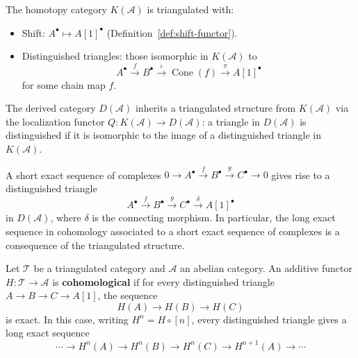 \begin{theorem}\label{thm:K-A-triangulated}
The homotopy category $K(\mathcal{A})$ is triangulated with:
\begin{itemize}
    \item Shift: $A^\bullet \mapsto A[1]^\bullet$ (Definition~\ref{def:shift-functor}).
    \item Distinguished triangles: those isomorphic in $K(\mathcal{A})$ to
    \[
        A^\bullet \xrightarrow{f} B^\bullet \xrightarrow{\iota} \operatorname{Cone}(f)
        \xrightarrow{\pi} A[1]^\bullet
    \]
    for some chain map $f$.
\end{itemize}
\end{theorem}

\begin{theorem}\label{thm:D-A-triangulated}
The derived category $D(\mathcal{A})$ inherits a triangulated structure from $K(\mathcal{A})$
via the localization functor $Q \colon K(\mathcal{A}) \to D(\mathcal{A})$: a triangle in
$D(\mathcal{A})$ is distinguished if it is isomorphic to the image of a distinguished
triangle in $K(\mathcal{A})$.
\end{theorem}

\begin{proposition}\label{prop:ses-to-triangle}
A short exact sequence of complexes $0 \to A^\bullet \xrightarrow{f} B^\bullet
\xrightarrow{g} C^\bullet \to 0$ gives rise to a distinguished triangle
\[
    A^\bullet \xrightarrow{f} B^\bullet \xrightarrow{g} C^\bullet
    \xrightarrow{\delta} A[1]^\bullet
\]
in $D(\mathcal{A})$, where $\delta$ is the connecting morphism. In particular, the
long exact sequence in cohomology associated to a short exact sequence of complexes
is a consequence of the triangulated structure.
\end{proposition}

\begin{proposition}\label{prop:cohomological-functor}
Let $\mathcal{T}$ be a triangulated category and $\mathcal{A}$ an abelian category.
An additive functor $H \colon \mathcal{T} \to \mathcal{A}$ is \textbf{cohomological} if
for every distinguished triangle $A \to B \to C \to A[1]$, the sequence
\[
    H(A) \longrightarrow H(B) \longrightarrow H(C)
\]
is exact. In this case, writing $H^n = H \circ [n]$, every distinguished triangle
gives a long exact sequence
\[
    \cdots \to H^n(A) \to H^n(B) \to H^n(C) \to H^{n+1}(A) \to \cdots
\]
\end{proposition}

